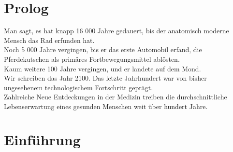 \section{Prolog}

Man sagt, es hat knapp 16 000 Jahre gedauert, bis der anatomisch moderne Mensch das Rad erfunden hat. \\
Noch 5 000 Jahre vergingen, bis er das erste Automobil erfand, die Pferdekutschen als primäres Fortbewegungsmittel ablösten. \\
Kaum weitere 100 Jahre vergingen, und er landete auf dem Mond. \\

Wir schreiben das Jahr 2100. Das letzte Jahrhundert war von bisher ungesehenem technologischem Fortschritt geprägt. \\
Zahlreiche 
Neue Entdeckungen in der Medizin treiben die durchschnittliche Lebenserwartung eines gesunden Menschen weit über hundert Jahre. \\




\section{Einführung}

